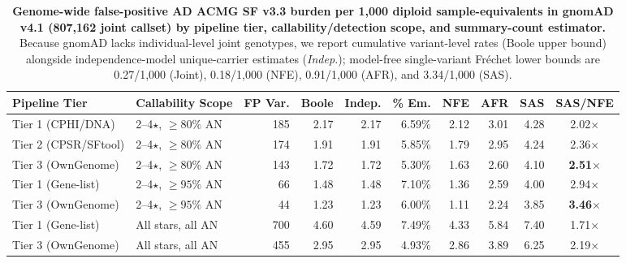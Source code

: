 \documentclass[11pt,letterpaper]{article}
\begin{document}
\begin{table}[!t]
\centering
\caption{\textbf{Genome-wide false-positive AD ACMG SF v3.3 burden per 1,000 diploid sample-equivalents in gnomAD v4.1 (807,162 joint callset) by pipeline tier, callability/detection scope, and summary-count estimator.} Because gnomAD lacks individual-level joint genotypes, we report cumulative variant-level rates (Boole upper bound) alongside independence-model unique-carrier estimates (\textit{Indep.}); model-free single-variant Fr\'{e}chet lower bounds are 0.27/1,000 (Joint), 0.18/1,000 (NFE), 0.91/1,000 (AFR), and 3.34/1,000 (SAS).}
\label{tab:burden}
\footnotesize
\setlength{\tabcolsep}{2.5pt}
\begin{tabularx}{\textwidth}{Y L{2.45cm} r r r r r r r c}
\toprule
\textbf{Pipeline Tier} & \textbf{Callability Scope} & \textbf{FP Var.} & \textbf{Boole} & \textbf{Indep.} & \textbf{\% Em.} & \textbf{NFE} & \textbf{AFR} & \textbf{SAS} & \textbf{SAS/NFE} \\
\midrule
Tier 1 (CPHI/DNA) & 2--4$\star$, $\ge 80\%$ AN & 185 & 2.17 & 2.17 & 6.59\% & 2.12 & 3.01 & 4.28 & 2.02$\times$ \\
Tier 2 (CPSR/SFtool) & 2--4$\star$, $\ge 80\%$ AN & 174 & 1.91 & 1.91 & 5.85\% & 1.79 & 2.95 & 4.24 & 2.36$\times$ \\
Tier 3 (OwnGenome) & 2--4$\star$, $\ge 80\%$ AN & 143 & 1.72 & 1.72 & 5.30\% & 1.63 & 2.60 & 4.10 & \textbf{2.51$\times$} \\
\midrule
Tier 1 (Gene-list) & 2--4$\star$, $\ge 95\%$ AN & 66 & 1.48 & 1.48 & 7.10\% & 1.36 & 2.59 & 4.00 & 2.94$\times$ \\
Tier 3 (OwnGenome) & 2--4$\star$, $\ge 95\%$ AN & 44 & 1.23 & 1.23 & 6.00\% & 1.11 & 2.24 & 3.85 & \textbf{3.46$\times$} \\
\midrule
Tier 1 (Gene-list) & All stars, all AN & 700 & 4.60 & 4.59 & 7.49\% & 4.33 & 5.84 & 7.40 & 1.71$\times$ \\
Tier 3 (OwnGenome) & All stars, all AN & 455 & 2.95 & 2.95 & 4.93\% & 2.86 & 3.89 & 6.25 & 2.19$\times$ \\
\bottomrule
\end{tabularx}
\vspace{-3pt}
\end{table}
\end{document}

